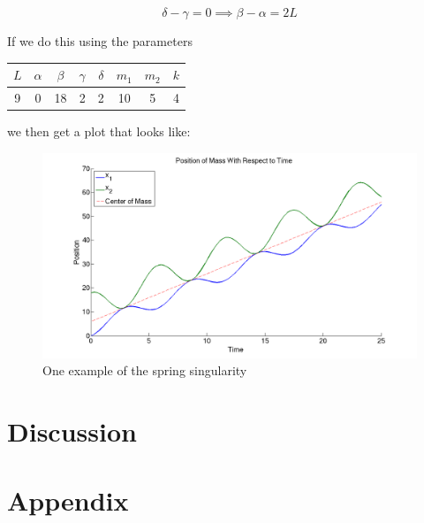 \documentclass[11pt, oneside]{article}   	%
\begin{document}
$$\delta - \gamma = 0 \implies \beta - \alpha = 2L$$

If we do this using the parameters

\begin{center}

\begin{tabular}{| c | c | c | c | c | c | c | c |}

\hline

$L$ & $\alpha$ & $\beta$ & $\gamma$ & $\delta$ & $m_1$ & $m_2$ & $k$ \\

\hline

 9 & 0 & 18 & 2 & 2 & 10 & 5 & 4\\

\hline

\end{tabular}

\end{center}

we then get a plot that looks like: \\

\begin{figure}[h!]
\centering \includegraphics[scale=0.3]{spring_sing}
\caption{\label{singularity}One example of the spring singularity}
\end{figure}



\section{Discussion}

\section{Appendix}
\end{document}
